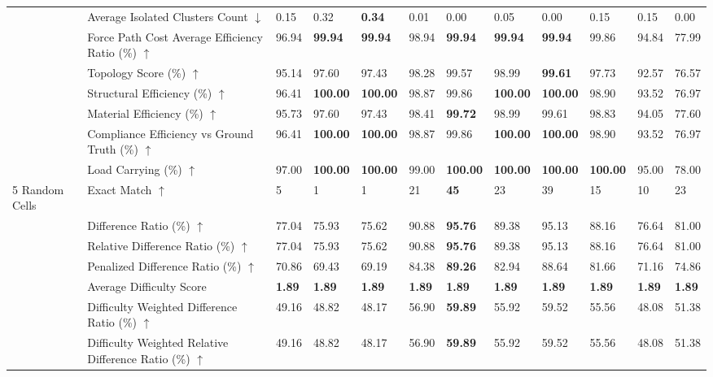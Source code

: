 \begin{table}[!h]
{\begin{tabular}{llllllllllll}
 & Average Isolated Clusters Count $\downarrow$ & 0.15 & 0.32 & \textbf{0.34} & 0.01 & 0.00 & 0.05 & 0.00 & 0.15 & 0.15 & 0.00 \\
 & Force Path Cost Average Efficiency Ratio (\%) $\uparrow$ & 96.94 & \textbf{99.94} & \textbf{99.94} & 98.94 & \textbf{99.94} & \textbf{99.94} & \textbf{99.94} & 99.86 & 94.84 & 77.99 \\
 & Topology Score (\%) $\uparrow$ & 95.14 & 97.60 & 97.43 & 98.28 & 99.57 & 98.99 & \textbf{99.61} & 97.73 & 92.57 & 76.57 \\
 & Structural Efficiency (\%) $\uparrow$ & 96.41 & \textbf{100.00} & \textbf{100.00} & 98.87 & 99.86 & \textbf{100.00} & \textbf{100.00} & 98.90 & 93.52 & 76.97 \\
 & Material Efficiency (\%) $\uparrow$ & 95.73 & 97.60 & 97.43 & 98.41 & \textbf{99.72} & 98.99 & 99.61 & 98.83 & 94.05 & 77.60 \\
 & Compliance Efficiency vs Ground Truth (\%) $\uparrow$ & 96.41 & \textbf{100.00} & \textbf{100.00} & 98.87 & 99.86 & \textbf{100.00} & \textbf{100.00} & 98.90 & 93.52 & 76.97 \\
 & Load Carrying (\%) $\uparrow$ & 97.00 & \textbf{100.00} & \textbf{100.00} & 99.00 & \textbf{100.00} & \textbf{100.00} & \textbf{100.00} & \textbf{100.00} & 95.00 & 78.00 \\
5 Random Cells & Exact Match $\uparrow$ & 5 & 1 & 1 & 21 & \textbf{45} & 23 & 39 & 15 & 10 & 23 \\
 & Difference Ratio (\%) $\uparrow$ & 77.04 & 75.93 & 75.62 & 90.88 & \textbf{95.76} & 89.38 & 95.13 & 88.16 & 76.64 & 81.00 \\
 & Relative Difference Ratio (\%) $\uparrow$ & 77.04 & 75.93 & 75.62 & 90.88 & \textbf{95.76} & 89.38 & 95.13 & 88.16 & 76.64 & 81.00 \\
 & Penalized Difference Ratio (\%) $\uparrow$ & 70.86 & 69.43 & 69.19 & 84.38 & \textbf{89.26} & 82.94 & 88.64 & 81.66 & 71.16 & 74.86 \\
 & Average Difficulty Score & \textbf{1.89} & \textbf{1.89} & \textbf{1.89} & \textbf{1.89} & \textbf{1.89} & \textbf{1.89} & \textbf{1.89} & \textbf{1.89} & \textbf{1.89} & \textbf{1.89} \\
 & Difficulty Weighted Difference Ratio (\%) $\uparrow$ & 49.16 & 48.82 & 48.17 & 56.90 & \textbf{59.89} & 55.92 & 59.52 & 55.56 & 48.08 & 51.38 \\
 & Difficulty Weighted Relative Difference Ratio (\%) $\uparrow$ & 49.16 & 48.82 & 48.17 & 56.90 & \textbf{59.89} & 55.92 & 59.52 & 55.56 & 48.08 & 51.38 \\

\end{tabular}}
\end{table}
